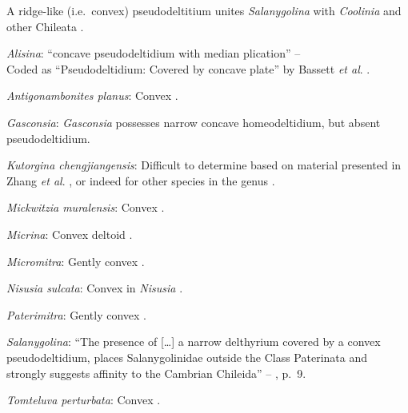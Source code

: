 \documentclass[openany]{book}
\theoremstyle{definition}
\theoremstyle{definition}
\theoremstyle{definition}
\theoremstyle{remark}
\begin{document}
A ridge-like (i.e.~convex) pseudodeltitium unites \emph{Salanygolina}
with \emph{Coolinia} and other Chileata
\citep[p.~6]{Holmer2009Theenigmatic}.

\hypertarget{Alisina-coding-99}{}
\emph{Alisina}: ``concave pseudodeltidium with median plication'' --
\citet{Williams2000LinguliformeaCraniiformea}\\
Coded as ``Pseudodeltidium: Covered by concave plate'' by Bassett
\emph{et al}. \citeyearpar{Bassett2001Functionalmorphology}.

\hypertarget{Antigonambonites_planus-coding-99}{}
\emph{Antigonambonites planus}: Convex \citep[fig.
508]{Williams2000LinguliformeaCraniiformea}.

\hypertarget{Gasconsia-coding-99}{}
\emph{Gasconsia}: \emph{Gasconsia} possesses narrow concave
homeodeltidium, but absent pseudodeltidium.

\hypertarget{Kutorgina_chengjiangensis-coding-99}{}
\emph{Kutorgina chengjiangensis}: Difficult to determine based on
material presented in Zhang \emph{et al}.
\citeyearpar{Zhang2007Rhynchonelliformeanbrachiopods}, or indeed for
other species in the genus
\citep[e.g.][]{Williams2000LinguliformeaCraniiformea, Skovsted2005EarlyCambrian, Holmer2018Theattachment}.

\hypertarget{Mickwitzia_muralensis-coding-99}{}
\emph{Mickwitzia muralensis}: Convex \citep[see][fig.
4B]{Balthasar2004Shellstructure}.

\hypertarget{Micrina-coding-99}{}
\emph{Micrina}: Convex deltoid \citep{Holmer2008TheEarly}.

\hypertarget{Micromitra-coding-99}{}
\emph{Micromitra}: Gently convex \citep[see][fig.
83.3]{Williams2000LinguliformeaCraniiformea}.

\hypertarget{Nisusia_sulcata-coding-99}{}
\emph{Nisusia sulcata}: Convex in \emph{Nisusia} \citep[see][fig.
8.4]{Rowell1985Theevolutionary}.

\hypertarget{Paterimitra-coding-99}{}
\emph{Paterimitra}: Gently convex \citep[see][fig.
83.1]{Williams2000LinguliformeaCraniiformea}.

\hypertarget{Salanygolina-coding-99}{}
\emph{Salanygolina}: ``The presence of {[}\ldots{}{]} a narrow
delthyrium covered by a convex pseudodeltidium, places Salanygolinidae
outside the Class Paterinata and strongly suggests affinity to the
Cambrian Chileida'' -- \citet{Holmer2009Theenigmatic}, p.~9.

\hypertarget{Tomteluva_perturbata-coding-99}{}
\emph{Tomteluva perturbata}: Convex \citep{Streng2016Anew}.
\end{document}
